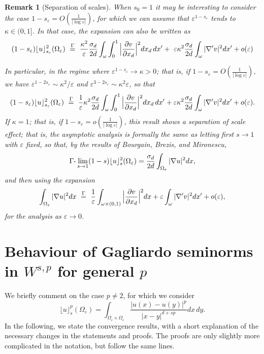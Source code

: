 \documentclass[11pt]{article}
\newtheorem{remark}[definition]{Remark}
\def\e{\varepsilon}
\begin{document}
\begin{remark}[Separation of scales]\rm
When $s_0=1$ it may be interesting to consider the case $
1-s_\e=O(\frac1{|\log\e|})$, for which we can assume that $\e^{1-s_\e}$ tends to $\kappa\in(0,1]$. In that case, the expansion can also be written as 
$$
(1-s_\e)\lfloor u\rfloor^2_{s_\e}(\Omega_\e)\ \buildrel\Gamma\over =\ \frac{\kappa^2}{
\e}\frac{\sigma_{d}}{2d}\int_{\omega}\int_0^1\Big|\frac{\partial v}{\partial x_d}\Big|^2 dx_d\, dx^\prime
+\
\e\kappa^2\frac{\sigma_{d}}{2d}\int_{\omega} |\nabla' v|^2 dx'
+o(\e)
$$

In particular, in the regime where $\e^{1-s_\e}\to \kappa>0$; that is, if
$1-s_\e=O(\frac1{|\log\e|})$,
we have $\e^{1-2s_\e}\sim{\kappa^2}/\e$ and $\e^{3-2s_\e}\sim {\kappa^2}\e$, so that 
$$
(1-s_\e)\lfloor u\rfloor^2_{s_\e}(\Omega_\e)\ \buildrel\Gamma\over =\ \frac1\e{\kappa^2}\frac{
\sigma_{d}}{2d}\int_{\omega}\int_0^1\Big|\frac{\partial v}{\partial x_d}\Big|^2 dx_d\, dx^\prime
+\e{\kappa^2}\frac{\sigma_{d}}{2d}\int_{\omega} |\nabla' v|^2 dx'
+o(\e).
$$
If $\kappa=1$; that is, if $1-s_\e=o(\frac1{|\log\e|})$, this result shows a {\em separation of scale effect}; that is, the asymptotic analysis is formally the same as letting first $s\to 1$ with $\e$ fixed, so that, by the results of 
Bourgain, Brezis, and Mironescu,
$$
\Gamma\hbox{-}\lim_{s\to 1} (1-s)\lfloor u\rfloor^2_{s}(\Omega_\e)= \frac{\sigma_{d}}{2d}\int_{\Omega_\e}|\nabla u|^2dx,
$$
and then using the expansion 
\begin{equation}\label{intro-4}
\int_{\Omega_\e} |\nabla u|^2dx\ \buildrel \Gamma\over =\ \frac1\e \int_{\omega\times (0,1)}\Big|\frac{\partial v}{\partial x_d}\Big|^2dx+ \e\int_{\omega}|\nabla'v|^2dx' +o(\e),
\end{equation} 
for the analysis as $\e\to 0$.
\end{remark}

\section{Behaviour of Gagliardo seminorms in $W^{s,p}$ for general $p$}
    We briefly comment on the case $p\neq 2$, for which we consider 
    \[\lfloor u
\rfloor^p_s(\Omega_\e)=\int_{\Omega_\e\times \Omega_\e} \frac{|u(x)-u(y)|^p}{|x-y|^{d+sp}} dx\,dy.\]
In the following, we state the convergence results, with a short explanation of the necessary changes in the statements and  proofs. The proofs are only slightly more complicated in the notation, but follow the same lines. 
\end{document}
